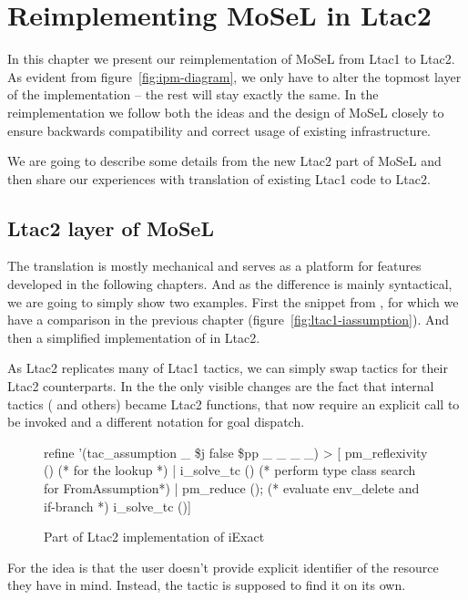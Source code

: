 \chapter{Reimplementing MoSeL in Ltac2}
\label{chap:ltac2-tactics-mosel}

In this chapter we present our reimplementation of MoSeL from Ltac1 to Ltac2.
As evident from figure~\ref{fig:ipm-diagram}, we only have to alter the topmost layer of the implementation -- the rest will stay exactly the same.
In the reimplementation we follow both the ideas and the design of MoSeL closely to ensure backwards compatibility and correct usage of existing infrastructure.

We are going to describe some details from the new Ltac2 part of MoSeL and then share our experiences with translation of existing Ltac1 code to Ltac2.

\section{Ltac2 layer of MoSeL}

The translation is mostly mechanical and serves as a platform for features developed in the following chapters.
And as the difference is mainly syntactical, we are going to simply show two examples.
First the snippet from , for which we have a comparison in the previous chapter (figure~\ref{fig:ltac1-iassumption}).
And then a simplified implementation of  in Ltac2.

As Ltac2 replicates many of Ltac1 tactics, we can simply swap tactics for their Ltac2 counterparts.
In the  the only visible changes are the fact that internal tactics ( and others) became Ltac2 functions, that now require an explicit call to be invoked and a different notation for goal dispatch.
\begin{figure}[H]
\begin{coq}
refine '(tac_assumption _ \$j false \$pp _ _ _ _) >
              [ pm_reflexivity () (* for the lookup *)
              | i_solve_tc () (* perform type class search for FromAssumption*)
              | pm_reduce (); (* evaluate env_delete and if-branch *)
                i_solve_tc ()]
\end{coq}
  \caption{Part of Ltac2 implementation of iExact}
  \label{fig:iexact-ltac2}
\end{figure}

For  the idea is that the user doesn't provide explicit identifier of the resource they have in mind.
Instead, the tactic is supposed to find it on its own.

